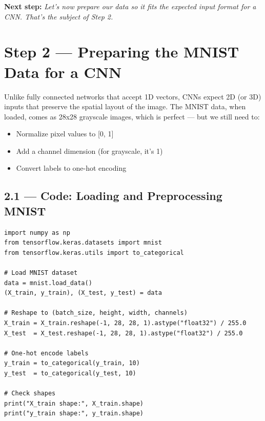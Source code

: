 \documentclass[11pt]{article}
\begin{document}
\vspace{2em}
\noindent\textbf{\Large Next step:} \textit{Let's now prepare our data so it fits the expected input format for a CNN. That’s the subject of Step 2.}




\section*{Step 2 — Preparing the MNIST Data for a CNN}

Unlike fully connected networks that accept 1D vectors, CNNs expect 2D (or 3D) inputs that preserve the spatial layout of the image. The MNIST data, when loaded, comes as 28x28 grayscale images, which is perfect — but we still need to:

\begin{itemize}
    \item Normalize pixel values to [0, 1]
    \item Add a channel dimension (for grayscale, it's 1)
    \item Convert labels to one-hot encoding
\end{itemize}

\subsection*{\textbf{2.1 — Code: Loading and Preprocessing MNIST}}

\begin{verbatim}
import numpy as np
from tensorflow.keras.datasets import mnist
from tensorflow.keras.utils import to_categorical

# Load MNIST dataset
data = mnist.load_data()
(X_train, y_train), (X_test, y_test) = data

# Reshape to (batch_size, height, width, channels)
X_train = X_train.reshape(-1, 28, 28, 1).astype("float32") / 255.0
X_test  = X_test.reshape(-1, 28, 28, 1).astype("float32") / 255.0

# One-hot encode labels
y_train = to_categorical(y_train, 10)
y_test  = to_categorical(y_test, 10)

# Check shapes
print("X_train shape:", X_train.shape)
print("y_train shape:", y_train.shape)
\end{verbatim}
\end{document}
